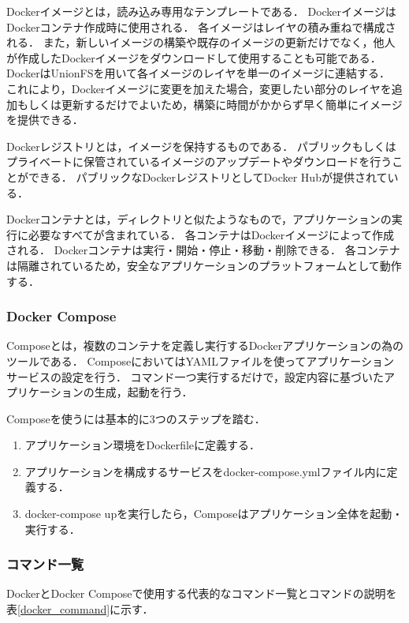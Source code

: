 Dockerイメージとは，読み込み専用なテンプレートである．
DockerイメージはDockerコンテナ作成時に使用される．
各イメージはレイヤの積み重ねで構成される．
また，新しいイメージの構築や既存のイメージの更新だけでなく，他人が作成したDockerイメージをダウンロードして使用することも可能である．
DockerはUnionFS\cite{Unionfs}を用いて各イメージのレイヤを単一のイメージに連結する．
これにより，Dockerイメージに変更を加えた場合，変更したい部分のレイヤを追加もしくは更新するだけでよいため，構築に時間がかからず早く簡単にイメージを提供できる．

Dockerレジストリとは，イメージを保持するものである．
パブリックもしくはプライベートに保管されているイメージのアップデートやダウンロードを行うことができる．
パブリックなDockerレジストリとしてDocker Hub\cite{dockerhub}が提供されている．

Dockerコンテナとは，ディレクトリと似たようなもので，アプリケーションの実行に必要なすべてが含まれている．
各コンテナはDockerイメージによって作成される．
Dockerコンテナは実行・開始・停止・移動・削除できる．
各コンテナは隔離されているため，安全なアプリケーションのプラットフォームとして動作する．


\subsubsection{Docker Compose}
Composeとは，複数のコンテナを定義し実行するDockerアプリケーションの為のツールである．
ComposeにおいてはYAML\cite{YAML}ファイルを使ってアプリケーションサービスの設定を行う．
コマンド一つ実行するだけで，設定内容に基づいたアプリケーションの生成，起動を行う．

Composeを使うには基本的に3つのステップを踏む．

\begin{enumerate}
    \item アプリケーション環境をDockerfileに定義する．
    \item アプリケーションを構成するサービスをdocker-compose.ymlファイル内に定義する．
    \item docker-compose upを実行したら，Composeはアプリケーション全体を起動・実行する．
\end{enumerate}

\newpage
\subsubsection{コマンド一覧}
DockerとDocker Composeで使用する代表的なコマンド一覧とコマンドの説明を表\ref{docker_command}に示す．


